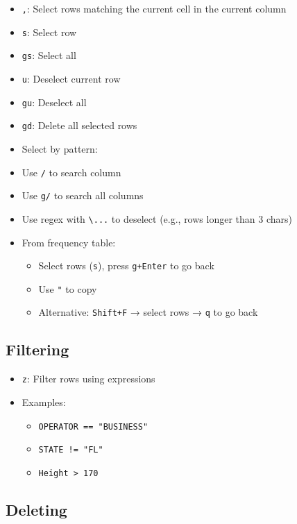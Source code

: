 \documentclass[
  letterpaper,
  DIV=11,
  numbers=noendperiod]{scrartcl}
\providecommand{\tightlist}{%
  \setlength{\itemsep}{0pt}\setlength{\parskip}{0pt}}\usepackage{longtable,booktabs,array}
\begin{document}
\begin{itemize}
\tightlist
\item
  \texttt{,}: Select rows matching the current cell in the current
  column
\item
  \texttt{s}: Select row
\item
  \texttt{gs}: Select all
\item
  \texttt{u}: Deselect current row
\item
  \texttt{gu}: Deselect all
\item
  \texttt{gd}: Delete all selected rows
\item
  Select by pattern:
\item
  Use \texttt{/} to search column
\item
  Use \texttt{g/} to search all columns
\item
  Use regex with \texttt{\textbackslash{}...} to deselect (e.g., rows
  longer than 3 chars)
\item
  From frequency table:

  \begin{itemize}
  \tightlist
  \item
    Select rows (\texttt{s}), press \texttt{g+Enter} to go back
  \item
    Use \texttt{"} to copy
  \item
    Alternative: \texttt{Shift+F} → select rows → \texttt{q} to go back
  \end{itemize}
\end{itemize}

\subsection{Filtering}\label{filtering}

\begin{itemize}
\tightlist
\item
  \texttt{z\textbar{}}: Filter rows using expressions
\item
  Examples:

  \begin{itemize}
  \tightlist
  \item
    \texttt{OPERATOR\ ==\ "BUSINESS"}
  \item
    \texttt{STATE\ !=\ "FL"}
  \item
    \texttt{Height\ \textgreater{}\ 170}
  \end{itemize}
\end{itemize}

\subsection{Deleting}\label{deleting}
\end{document}
